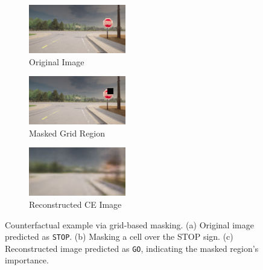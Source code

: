 \begin{figure}[htbp]
    \centering
    \begin{subfigure}[b]{0.3\textwidth}
        \includegraphics[width=\textwidth]{img/masking/grid_based_masking/original.png}
        \caption{Original Image}
        \label{fig:grid_orig}
    \end{subfigure}
    \hfill
    \begin{subfigure}[b]{0.3\textwidth}
        \includegraphics[width=\textwidth]{img/masking/grid_based_masking/reconstructed_grid_masked_image.png}
        \caption{Masked Grid Region}
        \label{fig:grid_masked}
    \end{subfigure}
    \hfill
    \begin{subfigure}[b]{0.3\textwidth}
        \includegraphics[width=\textwidth]{img/masking/grid_based_masking/CE_grid.png}
        \caption{Reconstructed CE Image}
        \label{fig:grid_recon}
    \end{subfigure}
    \caption[Grid-based counterfactual example]{Counterfactual example via grid-based masking. (a) Original image predicted as \texttt{STOP}. (b) Masking a cell over the STOP sign. (c) Reconstructed image predicted as \texttt{GO}, indicating the masked region's importance.}
    \label{fig:grid_ce_example}
\end{figure}


